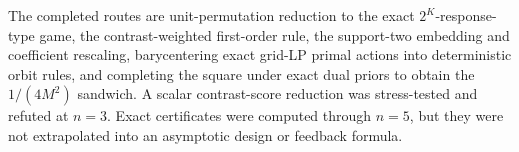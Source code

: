 The completed routes are unit-permutation reduction to the exact \(2^K\)-response-type game, the contrast-weighted first-order rule, the support-two embedding and coefficient rescaling, barycentering exact grid-LP primal actions into deterministic orbit rules, and completing the square under exact dual priors to obtain the \(1/(4M^2)\) sandwich. A scalar contrast-score reduction was stress-tested and refuted at \(n=3\). Exact certificates were computed through \(n=5\), but they were not extrapolated into an asymptotic design or feedback formula.